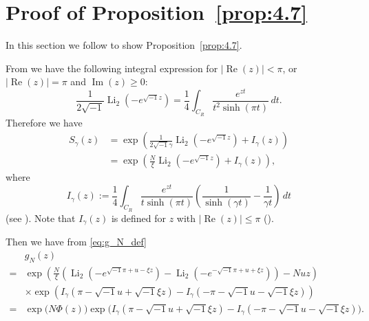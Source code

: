 \documentclass[a4paper]{amsart}
\theoremstyle{plain}
\theoremstyle{definition}
\theoremstyle{remark}
\newcommand{\Li}{\operatorname{Li}}
\renewcommand{\Re}{\operatorname{Re}}
\renewcommand{\Im}{\operatorname{Im}}
\numberwithin{equation}{section}
\begin{document}
\section{Proof of Proposition~\ref{prop:4.7}}
\label{sec:prop:4.7}
In this section we follow \cite[Appendix~A]{Andersen/Hansen:JKNOT2006} to show Proposition~\ref{prop:4.7}.
\par
From \cite[\S~4.1]{Andersen/Hansen:JKNOT2006} we have the following integral expression for $|\Re(z)|<\pi$, or $|\Re(z)|=\pi$ and $\Im(z)\ge0$:
\begin{equation*}
  \frac{1}{2\sqrt{-1}}
  \Li_2(-e^{\sqrt{-1}z})
  =
  \frac{1}{4}
  \int_{C_R}\frac{e^{zt}}{t^2\sinh(\pi t)}\,dt.
\end{equation*}
Therefore we have
\begin{equation*}
\begin{split}
  S_{\gamma}(z)
  &=
  \exp
  \left(
    \frac{1}{2\sqrt{-1}\gamma}
    \Li_2(-e^{\sqrt{-1}z})
    +
    I_{\gamma}(z)
  \right)
  \\
  &=
  \exp
  \left(
    \frac{N}{\xi}
    \Li_2(-e^{\sqrt{-1}z})
    +
    I_{\gamma}(z)
  \right),
\end{split}
\end{equation*}
where
\begin{equation*}
  I_{\gamma}(z)
  :=
  \frac{1}{4}
  \int_{C_R}\frac{e^{zt}}{t\sinh(\pi t)}
  \left(
    \frac{1}{\sinh(\gamma t)}-\frac{1}{\gamma t}
  \right)
  \,dt
\end{equation*}
(see \cite[Equation~(4.2)]{Andersen/Hansen:JKNOT2006}).
Note that $I_{\gamma}(z)$ is defined for $z$ with $|\Re(z)|\le\pi$ (\cite[Appendix~A]{Andersen/Hansen:JKNOT2006}).
\par
Then we have from \eqref{eq:g_N_def}
\begin{equation}\label{eq:g_N}
\begin{split}
  &g_N(z)
  \\
  =&
  \exp
  \left(
    \frac{N}{\xi}
    \left(
      \Li_2(-e^{\sqrt{-1}\pi+u-\xi z})
      -
      \Li_2(-e^{-\sqrt{-1}\pi+u+\xi z})
    \right)
    -Nuz
  \right)
  \\
  &\times
  \exp
  \left(
    I_{\gamma}(\pi-\sqrt{-1}u+\sqrt{-1}\xi z)
    -
    I_{\gamma}(-\pi-\sqrt{-1}u-\sqrt{-1}\xi z)
  \right)
  \\
  =&
  \exp\bigl(N\Phi(z)\bigr)
  \exp
  \bigl(
    I_{\gamma}(\pi-\sqrt{-1}u+\sqrt{-1}\xi z)
    -
    I_{\gamma}(-\pi-\sqrt{-1}u-\sqrt{-1}\xi z)
  \bigr).
\end{split}
\end{equation}
\end{document}
